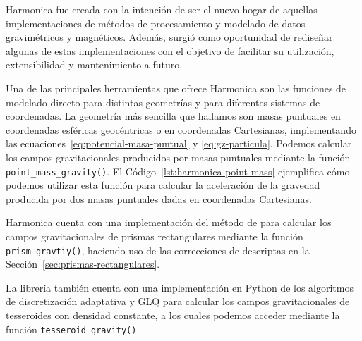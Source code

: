 Harmonica fue creada con la intención de ser el nuevo hogar de aquellas
implementaciones de métodos de procesamiento y modelado de datos gravimétricos
y magnéticos.
Además, surgió como oportunidad de rediseñar algunas de estas implementaciones
con el objetivo de facilitar su utilización, extensibilidad y mantenimiento
a futuro.

Una de las principales herramientas que ofrece Harmonica son las
funciones de modelado directo para distintas geometrías y para diferentes
sistemas de coordenadas.
La geometría más sencilla que hallamos son masas puntuales en coordenadas
esféricas geocéntricas o en coordenadas Cartesianas, implementando las
ecuaciones~\ref{eq:potencial-masa-puntual} y \ref{eq:gz-particula}.
Podemos calcular los campos gravitacionales producidos por masas puntuales
mediante la función \texttt{point\_mass\_gravity()}.
El Código~\ref{lst:harmonica-point-mass} ejemplifica cómo podemos utilizar esta
función para calcular la aceleración de la gravedad producida por dos masas
puntuales dadas en coordenadas Cartesianas.

Harmonica cuenta con una implementación del método de \citet{nagy2000} para
calcular los campos gravitacionales de prismas rectangulares mediante la
función \texttt{prism\_gravtiy()}, haciendo uso de las correcciones de
\citet{fukushima2020} descriptas en la Sección~\ref{sec:prismas-rectangulares}.

La librería también cuenta con una implementación en Python de los algoritmos
de discretización adaptativa y \ac{GLQ} para calcular los campos
gravitacionales de tesseroides con densidad constante, a los cuales podemos
acceder mediante la función \texttt{tesseroid\_gravity()}.



